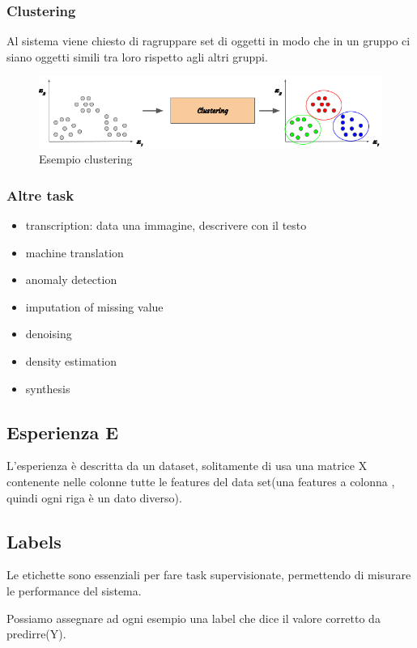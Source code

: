 \subsubsection{Clustering}
Al sistema viene chiesto di ragruppare set di oggetti in modo che in un gruppo ci siano
oggetti simili tra loro rispetto agli altri gruppi.

\begin{figure}[H]
    \centering
    \includegraphics[width=0.6\linewidth]{imgs/17---clusetering}
    \caption{Esempio clustering}
    \label{fig:clustering}
\end{figure}



\subsubsection{Altre task}
\begin{itemize}
    \item transcription: data una immagine, descrivere con il testo
    \item machine translation
    \item anomaly detection
    \item imputation of missing value
    \item denoising
    \item density estimation
    \item synthesis
\end{itemize}

\subsection{Esperienza E}
L'esperienza è descritta da un dataset, solitamente di usa una matrice X
contenente nelle colonne tutte le features del data set(una features a colonna
, quindi ogni riga è un dato diverso).

\subsection{Labels}
Le etichette sono essenziali per fare task supervisionate, permettendo di misurare le
performance del sistema.

Possiamo assegnare ad ogni esempio una label che dice il valore corretto da predirre(Y).


